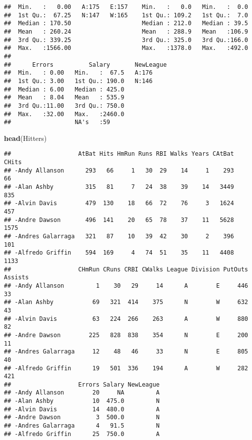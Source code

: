 \documentclass[]{article}
\newenvironment{Shaded}{\begin{snugshade}}{\end{snugshade}}
\newcommand{\KeywordTok}[1]{\textcolor[rgb]{0.13,0.29,0.53}{\textbf{#1}}}
\newcommand{\NormalTok}[1]{#1}
\begin{document}
\begin{verbatim}
##  Min.   :   0.00   A:175   E:157    Min.   :   0.0   Min.   :  0.0  
##  1st Qu.:  67.25   N:147   W:165    1st Qu.: 109.2   1st Qu.:  7.0  
##  Median : 170.50                    Median : 212.0   Median : 39.5  
##  Mean   : 260.24                    Mean   : 288.9   Mean   :106.9  
##  3rd Qu.: 339.25                    3rd Qu.: 325.0   3rd Qu.:166.0  
##  Max.   :1566.00                    Max.   :1378.0   Max.   :492.0  
##                                                                     
##      Errors          Salary       NewLeague
##  Min.   : 0.00   Min.   :  67.5   A:176    
##  1st Qu.: 3.00   1st Qu.: 190.0   N:146    
##  Median : 6.00   Median : 425.0            
##  Mean   : 8.04   Mean   : 535.9            
##  3rd Qu.:11.00   3rd Qu.: 750.0            
##  Max.   :32.00   Max.   :2460.0            
##                  NA's   :59
\end{verbatim}

\begin{Shaded}
\begin{Highlighting}[]
\KeywordTok{head}\NormalTok{(Hitters)}
\end{Highlighting}
\end{Shaded}

\begin{verbatim}
##                   AtBat Hits HmRun Runs RBI Walks Years CAtBat CHits
## -Andy Allanson      293   66     1   30  29    14     1    293    66
## -Alan Ashby         315   81     7   24  38    39    14   3449   835
## -Alvin Davis        479  130    18   66  72    76     3   1624   457
## -Andre Dawson       496  141    20   65  78    37    11   5628  1575
## -Andres Galarraga   321   87    10   39  42    30     2    396   101
## -Alfredo Griffin    594  169     4   74  51    35    11   4408  1133
##                   CHmRun CRuns CRBI CWalks League Division PutOuts Assists
## -Andy Allanson         1    30   29     14      A        E     446      33
## -Alan Ashby           69   321  414    375      N        W     632      43
## -Alvin Davis          63   224  266    263      A        W     880      82
## -Andre Dawson        225   828  838    354      N        E     200      11
## -Andres Galarraga     12    48   46     33      N        E     805      40
## -Alfredo Griffin      19   501  336    194      A        W     282     421
##                   Errors Salary NewLeague
## -Andy Allanson        20     NA         A
## -Alan Ashby           10  475.0         N
## -Alvin Davis          14  480.0         A
## -Andre Dawson          3  500.0         N
## -Andres Galarraga      4   91.5         N
## -Alfredo Griffin      25  750.0         A
\end{verbatim}
\end{document}
